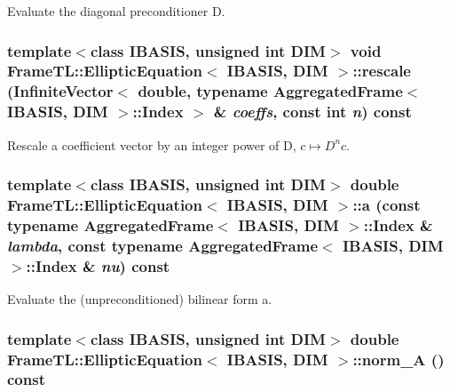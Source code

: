 Evaluate the diagonal preconditioner D. \hypertarget{classFrameTL_1_1EllipticEquation_ce9d2d6b07a48454f4f2ca76908a665a}{
\subsubsection[rescale]{\setlength{\rightskip}{0pt plus 5cm}template$<$class IBASIS, unsigned int DIM$>$ void {\bf FrameTL::EllipticEquation}$<$ IBASIS, DIM $>$::rescale (InfiniteVector$<$ double, typename {\bf AggregatedFrame}$<$ IBASIS, DIM $>$::{\bf Index} $>$ \& {\em coeffs}, \/  const int {\em n}) const}}
\label{classFrameTL_1_1EllipticEquation_ce9d2d6b07a48454f4f2ca76908a665a}


Rescale a coefficient vector by an integer power of D, $c \mapsto D^{n}c$. \hypertarget{classFrameTL_1_1EllipticEquation_b0b18bd3a6a0f43c5ed302a2fc80c235}{
\subsubsection[a]{\setlength{\rightskip}{0pt plus 5cm}template$<$class IBASIS, unsigned int DIM$>$ double {\bf FrameTL::EllipticEquation}$<$ IBASIS, DIM $>$::a (const typename {\bf AggregatedFrame}$<$ IBASIS, DIM $>$::{\bf Index} \& {\em lambda}, \/  const typename {\bf AggregatedFrame}$<$ IBASIS, DIM $>$::{\bf Index} \& {\em nu}) const}}
\label{classFrameTL_1_1EllipticEquation_b0b18bd3a6a0f43c5ed302a2fc80c235}


Evaluate the (unpreconditioned) bilinear form a. \hypertarget{classFrameTL_1_1EllipticEquation_49469f7106fa3e7a70791e2da6146df8}{
\subsubsection[norm\_\-A]{\setlength{\rightskip}{0pt plus 5cm}template$<$class IBASIS, unsigned int DIM$>$ double {\bf FrameTL::EllipticEquation}$<$ IBASIS, DIM $>$::norm\_\-A () const}}
\label{classFrameTL_1_1EllipticEquation_49469f7106fa3e7a70791e2da6146df8}


